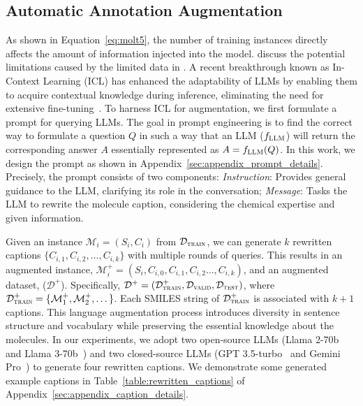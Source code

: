 \subsection{Automatic Annotation Augmentation}
\label{subsec:language_augmentation}

As shown in Equation~\ref{eq:molt5}, the number of training instances directly affects the amount of information injected into the model. 
\citet{ELRHCJ22} discuss the potential limitations caused by the limited data in \olddataset. 
% 
A recent breakthrough known as In-Context Learning (ICL) has enhanced the adaptability of LLMs by enabling them to acquire contextual knowledge during inference, eliminating the need for extensive fine-tuning~\cite{CTR20}. 
To harness ICL for \olddataset augmentation, we first formulate a prompt for querying LLMs.
% 
The goal in prompt engineering is to find the correct way to formulate a question $Q$ in such a way that an LLM ($f_{\textsc{LLM}}$) will return the corresponding answer $A$ essentially represented as $A = f_{\textsc{LLM}}(Q)$. 
% 
In this work, we design the prompt as shown in Appendix~\ref{sec:appendix_prompt_details}. 
% 
Precisely, the prompt consists of two components: \emph{Instruction}: Provides general guidance to the LLM, clarifying its role in the conversation; \emph{Message}: Tasks the LLM to rewrite the molecule caption, considering the chemical expertise and given information.

Given an instance $\mathcal{M}_i = (S_i, C_i)$ from $\mathcal{D}_{\textsc{train}}$, we can generate $k$ rewritten captions $\{ C_{i, 1}, C_{i, 2}, \dots, C_{i, k} \}$ with multiple rounds of queries. 
This results in an augmented instance, $\mathcal{M}^{+}_i = (S_i, C_{i, 0}, C_{i, 1}, C_{i, 2} \dots, C_{i, k})$, and an augmented dataset, \newdataset ($\mathcal{D}^{+}$).
Specifically, $\mathcal{D}^{+} = (\mathcal{D}^{+}_{\textsc{train}}, \mathcal{D}_{\textsc{valid}}, \mathcal{D}_{\textsc{test}})$, where $\mathcal{D}^{+}_{\textsc{train}} = \{ \mathcal{M}^+_1, \mathcal{M}^+_2, \dots \}$.
Each SMILES string of $\mathcal{D}^{+}_{\textsc{train}}$ is associated with $k+1$ captions. 
This language augmentation process introduces diversity in sentence structure and vocabulary while preserving the essential knowledge about the molecules.
% 
In our experiments, we adopt two open-source LLMs (Llama 2-70b~\cite{TMSA23} and Llama 3-70b~\cite{TMSA23}) and two closed-source LLMs (GPT 3.5-turbo~\cite{AAAA23} and Gemini Pro~\cite{Gemini24}) to generate four rewritten captions. 
We demonstrate some generated example captions in Table~\ref{table:rewritten_captions} of Appendix~\ref{sec:appendix_caption_details}. 

